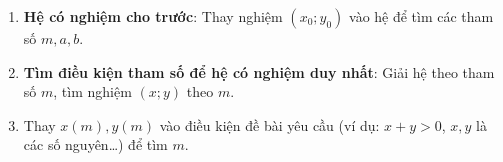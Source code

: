 \begin{enumerate}
\item \textbf{Hệ có nghiệm cho trước}: Thay nghiệm $(x_0; y_0)$ vào hệ để tìm các tham số $m, a, b$.
\item \textbf{Tìm điều kiện tham số để hệ có nghiệm duy nhất}: Giải hệ theo tham số $m$, tìm nghiệm $(x; y)$ theo $m$.
\item Thay $x(m), y(m)$ vào điều kiện đề bài yêu cầu (ví dụ: $x + y > 0$, $x, y$ là các số nguyên\dots) để tìm $m$.
\end{enumerate}
